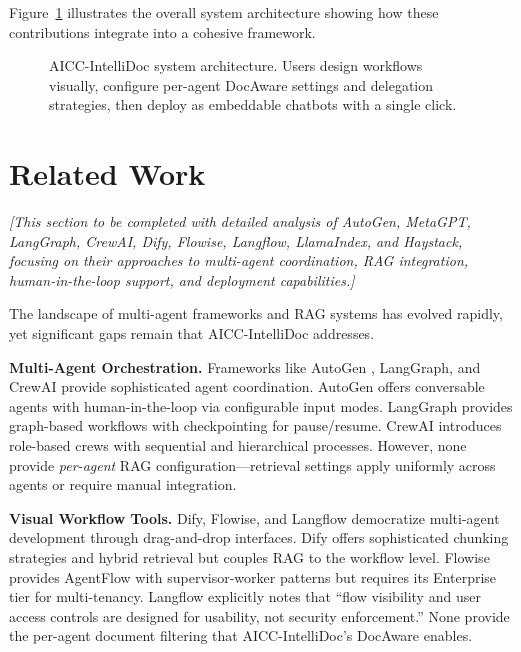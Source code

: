 \documentclass[11pt]{article}
\begin{document}
Figure~\ref{fig:system-overview} illustrates the overall system architecture showing how these contributions integrate into a cohesive framework.

\begin{figure}[t]
    \centering
    \caption{AICC-IntelliDoc system architecture. Users design workflows visually, configure per-agent DocAware settings and delegation strategies, then deploy as embeddable chatbots with a single click.}
    \label{fig:system-overview}
\end{figure}

\section{Related Work}
\label{sec:related}

\textit{[This section to be completed with detailed analysis of AutoGen, MetaGPT, LangGraph, CrewAI, Dify, Flowise, Langflow, LlamaIndex, and Haystack, focusing on their approaches to multi-agent coordination, RAG integration, human-in-the-loop support, and deployment capabilities.]}

The landscape of multi-agent frameworks and RAG systems has evolved rapidly, yet significant gaps remain that AICC-IntelliDoc addresses.

\textbf{Multi-Agent Orchestration.} Frameworks like AutoGen \cite{autogen2023}, LangGraph, and CrewAI provide sophisticated agent coordination. AutoGen offers conversable agents with human-in-the-loop via configurable input modes. LangGraph provides graph-based workflows with checkpointing for pause/resume. CrewAI introduces role-based crews with sequential and hierarchical processes. However, none provide \textit{per-agent} RAG configuration—retrieval settings apply uniformly across agents or require manual integration.

\textbf{Visual Workflow Tools.} Dify, Flowise, and Langflow democratize multi-agent development through drag-and-drop interfaces. Dify offers sophisticated chunking strategies and hybrid retrieval but couples RAG to the workflow level. Flowise provides AgentFlow with supervisor-worker patterns but requires its Enterprise tier for multi-tenancy. Langflow explicitly notes that ``flow visibility and user access controls are designed for usability, not security enforcement.'' None provide the per-agent document filtering that AICC-IntelliDoc's DocAware enables.
\end{document}
